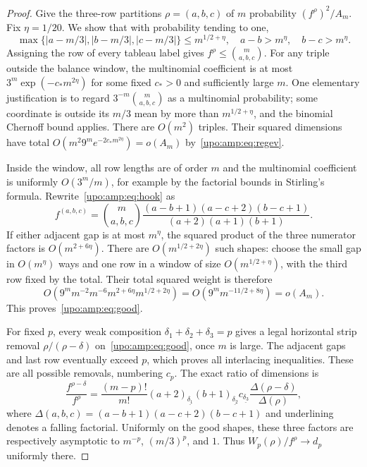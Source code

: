 \documentclass[11pt,letterpaper]{article}
\theoremstyle{remark}\newtheorem{remark}[theorem]{Remark}
\numberwithin{equation}{section}
\begin{document}
\begin{proof}
Give the three-row partitions $\rho=(a,b,c)$ of $m$ probability
$(f^\rho)^2/A_m$. Fix $\eta=1/20$. We show that with probability tending
to one,
\begin{equation}\label{upo:amp:eq:good}
\max\{|a-m/3|,|b-m/3|,|c-m/3|\}\le m^{1/2+\eta},
\quad a-b>m^\eta,\quad b-c>m^\eta.
\end{equation}
Assigning the row of every tableau label gives
$f^\rho\le\binom m{a,b,c}$. For any triple outside the balance window,
the multinomial coefficient is at most
$3^m\exp(-c_*m^{2\eta})$ for some fixed $c_*>0$ and sufficiently large
$m$. One elementary justification is to regard
$3^{-m}\binom m{a,b,c}$ as a multinomial probability; some coordinate is
outside its $m/3$ mean by more than $m^{1/2+\eta}$, and the binomial
Chernoff bound applies. There are $O(m^2)$ triples. Their squared
dimensions have total
$O(m^2 9^m e^{-2c_*m^{2\eta}})=o(A_m)$ by~\eqref{upo:amp:eq:regev}.

Inside the window, all row lengths are of order $m$ and the multinomial
coefficient is uniformly $O(3^m/m)$, for example by the factorial bounds
in Stirling's formula. Rewrite~\eqref{upo:amp:eq:hook} as
\[
f^{(a,b,c)}=\binom m{a,b,c}
\frac{(a-b+1)(a-c+2)(b-c+1)}{(a+2)(a+1)(b+1)}.
\]
If either adjacent gap is at most $m^\eta$, the squared product of the
three numerator factors is $O(m^{2+6\eta})$. There are
$O(m^{1/2+2\eta})$ such shapes: choose the small gap in $O(m^\eta)$
ways and one row in a window of size $O(m^{1/2+\eta})$, with the third
row fixed by the total. Their total squared weight is therefore
\[
O\left(9^m m^{-2}m^{-6}m^{2+6\eta}
m^{1/2+2\eta}\right)
=O(9^m m^{-11/2+8\eta})=o(A_m).
\]
This proves~\eqref{upo:amp:eq:good}.

For fixed $p$, every weak composition
$\delta_1+\delta_2+\delta_3=p$ gives a legal horizontal strip removal
$\rho/(\rho-\delta)$ on~\eqref{upo:amp:eq:good}, once $m$ is large. The adjacent
gaps and last row eventually exceed $p$, which proves all interlacing
inequalities. These are all possible removals, numbering $c_p$.
The exact ratio of dimensions is
\begin{equation}\label{upo:amp:eq:ratiohook}
\frac{f^{\rho-\delta}}{f^\rho}=
\frac{(m-p)!}{m!}
(a+2)_{\underline{\delta_1}}
(b+1)_{\underline{\delta_2}}
c_{\underline{\delta_3}}
\frac{\Delta(\rho-\delta)}{\Delta(\rho)},
\end{equation}
where $\Delta(a,b,c)=(a-b+1)(a-c+2)(b-c+1)$ and underlining denotes
a falling factorial. Uniformly on the good shapes, these three factors
are respectively asymptotic to $m^{-p}$, $(m/3)^p$, and $1$.
Thus $W_p(\rho)/f^\rho\to d_p$ uniformly there.


\end{proof}
\end{document}
